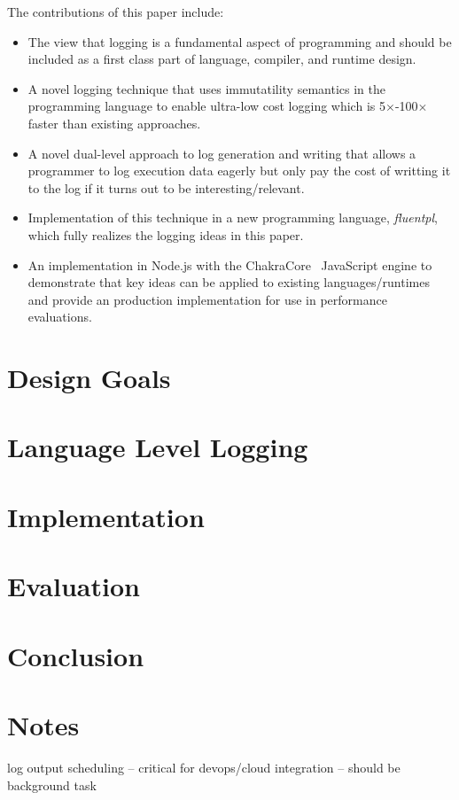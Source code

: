 \documentclass[preprint]{sig-alternate-05-2015}
\begin{document}
\noindent
The contributions of this paper include:
\begin{itemize}
\item The view that logging is a fundamental aspect of programming and should be
included as a first class part of language, compiler, and runtime design.

\item A novel logging technique that uses immutatility semantics in the
programming language to enable ultra-low cost logging which is
5$\times$-100$\times$ faster than existing approaches.

\item A novel dual-level approach to log generation and writing that allows a
programmer to log execution data eagerly but only pay the cost of writting it to
the log if it turns out to be interesting/relevant.

\item Implementation of this technique in a new programming language,
\emph{fluentpl}, which fully realizes the logging ideas in this paper. 

\item An implementation in Node.js with the ChakraCore~\cite{NodeChakraCore} 
JavaScript engine to demonstrate that key ideas can be applied to existing
languages/runtimes and provide an production implementation for use in
performance evaluations.
\end{itemize}

\section{Design Goals}
\label{sec:design}


\section{Language Level Logging}

\section{Implementation}

\section{Evaluation}

\section{Conclusion}

\section{Notes} log output scheduling -- critical for devops/cloud integration
-- should be background task


\balance

{
\raggedright 


 
}
\end{document}
